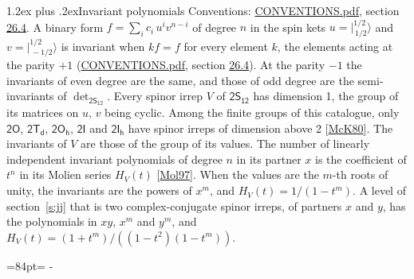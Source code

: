 \documentclass[10pt,a4paper]{article}
\makeatletter
\renewcommand\section{\@startsection{section}{1}{\z@}{-3ex plus -1ex minus -.2ex}%
  {1.2ex plus .2ex}{\normalfont\large\sffamily\bfseries\color{parttitle}}}
\newcommand{\needspace}[1]{\par\penalty-100\begingroup\dimen0=#1\relax\dimen2=\pagegoal
  \advance\dimen2-\pagetotal\ifdim\dimen0>\dimen2\relax\ifdim\dimen2>0pt\vfil\break\fi\fi
  \endgroup}
\numberwithin{equation}{section}
\newcommand{\grp}[1]{\mathsf{#1}}
\newcommand{\jm}[2]{\bigl\lvert{}^{#1}_{\,#2}\bigr\rangle}
\makeatother
\begin{document}
\section{Invariant polynomials}\label{s:invariants}
Conventions: \href{../../CONVENTIONS.pdf}{CONVENTIONS.pdf}, section \href{../../CONVENTIONS.pdf\#conv.26.4}{26.4}.
\leavevmode\label{n:local.binary.form}A binary form $f = \sum_i c_i\, u^i v^{n-i}$ of degree $n$ in the spin kets $u = \jm{1/2}{1/2}$ and $v = \jm{1/2}{-1/2}$ is invariant when $k f = f$ for every element $k$, the elements acting at the parity $+1$ (\href{../../CONVENTIONS.pdf}{CONVENTIONS.pdf}, section \href{../../CONVENTIONS.pdf\#conv.26.4}{26.4}). At the parity $-1$ the invariants of even degree are the same, and those of odd degree are the semi-invariants of $\det_{\grp{2S_{12}}}$.
\leavevmode\label{n:function.hilbert}Every spinor irrep $V$ of $\grp{2S_{12}}$ has dimension 1, the group of its matrices on $u$, $v$ being cyclic. Among the finite groups of this catalogue, only $\grp{2O}$, $\grp{2T_{d}}$, $\grp{2O_{h}}$, $\grp{2I}$ and $\grp{2I_{h}}$ have spinor irreps of dimension above 2 [\href{../../../REFERENCES.pdf\#ref.McK80}{McK80}]. The invariants of $V$ are those of the group of its values. \label{n:local.partner.x}The number of linearly independent invariant polynomials of degree $n$ in its partner $x$ is the coefficient of $t^n$ in its Molien series $H_V(t)$ [\href{../../../REFERENCES.pdf\#ref.Mol97}{Mol97}]. When the values are the $m$-th roots of unity, the invariants are the powers of $x^{m}$, and $H_V(t) = 1/(1 - t^{m})$. A level of section~\ref{s:jj} that is two complex-conjugate spinor irreps, of partners $x$ and $y$, has the polynomials in $xy$, $x^{m}$ and $y^{m}$, and $H_V(t) = (1 + t^{m})/((1 - t^{2})(1 - t^{m}))$.
\needspace{84pt}
\end{document}
